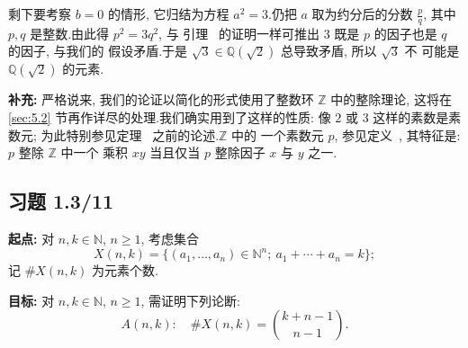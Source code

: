 剩下要考察 $b = 0$ 的情形, 它归结为方程 $a^2 = 3$.仍把 $a$ 取为约分后的分数
$\frac{p}{q}$, 其中 $p, q$ 是整数.由此得 $p^2 = 3q^2$, 与
引理~ 的证明一样可推出 $3$ 既是 $p$ 的因子也是 $q$ 的因子, 与我们的
假设矛盾.于是 $\sqrt{3} \in \mathbb{Q}(\sqrt{2})$ 总导致矛盾, 所以 $\sqrt{3}$ 不
可能是 $\mathbb{Q}(\sqrt{2})$ 的元素.

\noindent\textbf{补充:} 严格说来, 我们的论证以简化的形式使用了整数环 $\mathbb{Z}$
中的整除理论, 这将在 \ref{sec:5.2} 节再作详尽的处理.我们确实用到了这样的性质: 像 $2$ 或 $3$
这样的素数是素数元; 为此特别参见定理~ 之前的论述.$\mathbb{Z}$ 中的
一个素数元 $p$, 参见定义~, 其特征是: $p$ 整除 $\mathbb{Z}$ 中一个
乘积 $xy$ 当且仅当 $p$ 整除因子 $x$ 与 $y$ 之一.

\subsection*{习题 1.3/11}

\noindent\textbf{起点:} 对 $n, k \in \mathbb{N}$, $n \geq 1$, 考虑集合
\[
X(n, k) = \bigl\{ (a_1, \ldots, a_n) \in \mathbb{N}^n ;\ a_1 + \cdots + a_n = k \bigr\};
\]
记 $\#X(n, k)$ 为元素个数.

\noindent\textbf{目标:} 对 $n, k \in \mathbb{N}$, $n \geq 1$, 需证明下列论断:
\[
A(n, k) \colon \quad \#X(n, k) = \binom{k + n - 1}{n - 1}\text{.}
\]

